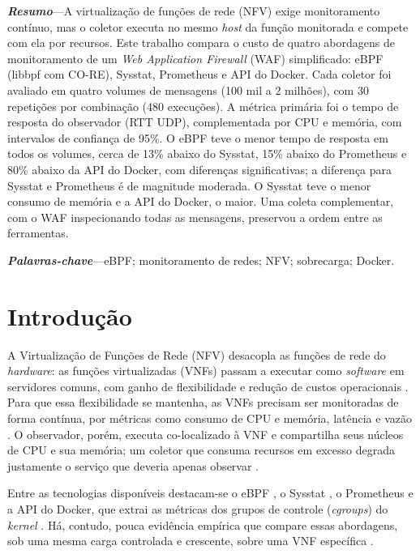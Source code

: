 \documentclass{ieeeaccess}
\begin{document}
\maketitle

\noindent\textbf{\textit{Resumo}}---A virtualização de funções de rede (NFV) exige monitoramento contínuo, mas o coletor executa no mesmo \textit{host} da função monitorada e compete com ela por recursos. Este trabalho compara o custo de quatro abordagens de monitoramento de um \textit{Web Application Firewall} (WAF) simplificado: eBPF (libbpf com CO-RE), Sysstat, Prometheus e API do Docker. Cada coletor foi avaliado em quatro volumes de mensagens (100 mil a 2 milhões), com 30 repetições por combinação (480 execuções). A métrica primária foi o tempo de resposta do observador (RTT UDP), complementada por CPU e memória, com intervalos de confiança de 95\%. O eBPF teve o menor tempo de resposta em todos os volumes, cerca de 13\% abaixo do Sysstat, 15\% abaixo do Prometheus e 80\% abaixo da API do Docker, com diferenças significativas; a diferença para Sysstat e Prometheus é de magnitude moderada. O Sysstat teve o menor consumo de memória e a API do Docker, o maior. Uma coleta complementar, com o WAF inspecionando todas as mensagens, preservou a ordem entre as ferramentas.

\noindent\textbf{\textit{Palavras-chave}}---eBPF; monitoramento de redes; NFV; sobrecarga; Docker.

\section{Introdução}
\label{sec:intro}
A Virtualização de Funções de Rede (NFV) desacopla as funções de rede do \textit{hardware}: as funções virtualizadas (VNFs) passam a executar como \textit{software} em servidores comuns, com ganho de flexibilidade e redução de custos operacionais \cite{mijumbi2016,oliveira2026-sbrc}. Para que essa flexibilidade se mantenha, as VNFs precisam ser monitoradas de forma contínua, por métricas como consumo de CPU e memória, latência e vazão \cite{rfc6390}. O observador, porém, executa co-localizado à VNF e compartilha seus núcleos de CPU e sua memória; um coletor que consuma recursos em excesso degrada justamente o serviço que deveria apenas observar \cite{10.1145/3397022}.

Entre as tecnologias disponíveis destacam-se o eBPF \cite{gregg_bpf_2019}, o Sysstat \cite{godard2024sysstat}, o Prometheus \cite{turnbull_prometheus_2018} e a API do Docker, que extrai as métricas dos grupos de controle (\textit{cgroups}) do \textit{kernel} \cite{docker_runmetrics,kernel_cgroup_v2}. Há, contudo, pouca evidência empírica que compare essas abordagens, sob uma mesma carga controlada e crescente, sobre uma VNF específica \cite{usman_observability_2022}.
\end{document}
